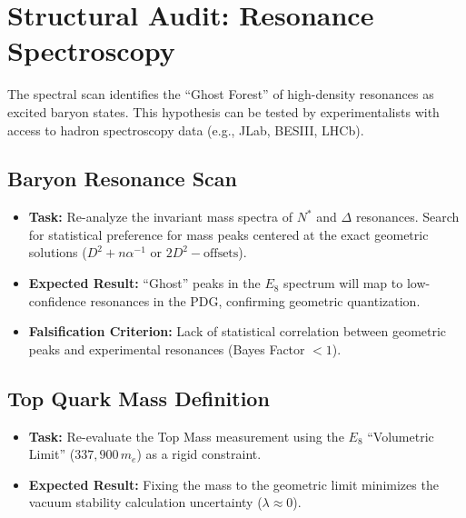 \section{Structural Audit: Resonance Spectroscopy}

The spectral scan identifies the ``Ghost Forest'' of high-density resonances as excited baryon states. This hypothesis can be tested by experimentalists with access to hadron spectroscopy data (e.g., JLab, BESIII, LHCb).

\subsection*{Baryon Resonance Scan}

\begin{itemize}
    \item \textbf{Task:} Re-analyze the invariant mass spectra of $N^*$ and $\Delta$ resonances. Search for statistical preference for mass peaks centered at the exact geometric solutions ($D^2 + n\alpha^{-1}$ or $2D^2 - \text{offsets}$).
    \item \textbf{Expected Result:} ``Ghost'' peaks in the $E_8$ spectrum will map to low-confidence resonances in the PDG, confirming geometric quantization.
    \item \textbf{Falsification Criterion:} Lack of statistical correlation between geometric peaks and experimental resonances (Bayes Factor $< 1$).
\end{itemize}

\subsection*{Top Quark Mass Definition}

\begin{itemize}
    \item \textbf{Task:} Re-evaluate the Top Mass measurement using the $E_8$ ``Volumetric Limit'' ($337,900 \, m_e$) as a rigid constraint.
    \item \textbf{Expected Result:} Fixing the mass to the geometric limit minimizes the vacuum stability calculation uncertainty ($\lambda \approx 0$).
\end{itemize}

